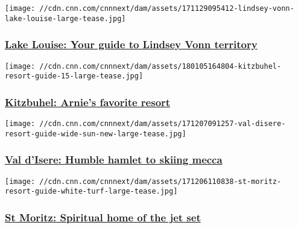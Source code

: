 \href{/travel/article/lindsey-vonn-lake-louise-canada-resort-guide-skiing/index.html}{}

\texttt{[image: //cdn.cnn.com/cnnnext/dam/assets/171129095412-lindsey-vonn-lake-louise-large-tease.jpg]}

\hypertarget{lake-louise-your-guide-to-lindsey-vonn-territory}{%
\subsubsection{\texorpdfstring{\href{/travel/article/lindsey-vonn-lake-louise-canada-resort-guide-skiing/index.html}{Lake
Louise: Your guide to Lindsey Vonn
territory}}{Lake Louise: Your guide to Lindsey Vonn territory}}\label{lake-louise-your-guide-to-lindsey-vonn-territory}}

\href{/travel/article/kitzbuhel-austria-ski-resort-guide/index.html}{}

\texttt{[image: //cdn.cnn.com/cnnnext/dam/assets/180105164804-kitzbuhel-resort-guide-15-large-tease.jpg]}

\hypertarget{kitzbuhel-arnies-favorite-resort}{%
\subsubsection{\texorpdfstring{\href{/travel/article/kitzbuhel-austria-ski-resort-guide/index.html}{Kitzbuhel:
Arnie's favorite
resort}}{Kitzbuhel: Arnie's favorite resort}}\label{kitzbuhel-arnies-favorite-resort}}

\href{/travel/article/val-disere-resort-guide/index.html}{}

\texttt{[image: //cdn.cnn.com/cnnnext/dam/assets/171207091257-val-disere-resort-guide-wide-sun-new-large-tease.jpg]}

\hypertarget{val-disere-humble-hamlet-to-skiing-mecca}{%
\subsubsection{\texorpdfstring{\href{/travel/article/val-disere-resort-guide/index.html}{Val
d'Isere: Humble hamlet to skiing
mecca}}{Val d'Isere: Humble hamlet to skiing mecca}}\label{val-disere-humble-hamlet-to-skiing-mecca}}

\href{/travel/article/st-moritz-ski-resort-guide/index.html}{}

\texttt{[image: //cdn.cnn.com/cnnnext/dam/assets/171206110838-st-moritz-resort-guide-white-turf-large-tease.jpg]}

\hypertarget{st-moritz-spiritual-home-of-the-jet-set}{%
\subsubsection{\texorpdfstring{\href{/travel/article/st-moritz-ski-resort-guide/index.html}{St
Moritz: Spiritual home of the jet
set}}{St Moritz: Spiritual home of the jet set}}\label{st-moritz-spiritual-home-of-the-jet-set}}

